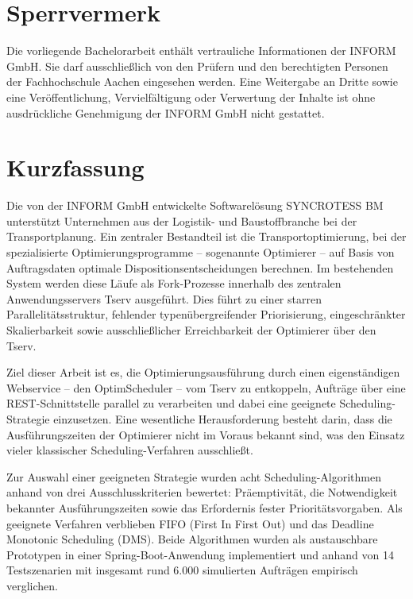 \documentclass[
    12pt,               
    a4paper,            
    ngerman,            
    parskip=half,       
    headings=normal,   
    numbers=enddot,     
    toc=chapterentrywithdots 
]{scrreprt}\usepackage[utf8]{inputenc}
\author{Niklas Paar}
\date{May 2026}
\begin{document}
 

\section*{Sperrvermerk}
Die vorliegende Bachelorarbeit enthält vertrauliche Informationen der INFORM GmbH. 
Sie darf ausschließlich von den Prüfern und den berechtigten Personen der Fachhochschule Aachen 
eingesehen werden. Eine Weitergabe an Dritte sowie eine Veröffentlichung, Vervielfältigung oder 
Verwertung der Inhalte ist ohne ausdrückliche Genehmigung der INFORM GmbH nicht gestattet.
\newpage

\section*{Kurzfassung}
Die von der INFORM GmbH entwickelte Softwarelösung SYNCROTESS BM unterstützt Unternehmen aus der Logistik- und Baustoffbranche bei der Transportplanung. Ein zentraler Bestandteil ist die Transportoptimierung, bei der spezialisierte Optimierungsprogramme -- sogenannte Optimierer -- auf Basis von Auftragsdaten optimale Dispositionsentscheidungen berechnen. Im bestehenden System werden diese Läufe als Fork-Prozesse innerhalb des zentralen Anwendungsservers Tserv ausgeführt. Dies führt zu einer starren Parallelitätsstruktur, fehlender typenübergreifender Priorisierung, eingeschränkter Skalierbarkeit sowie ausschließlicher Erreichbarkeit der Optimierer über den Tserv.

Ziel dieser Arbeit ist es, die Optimierungsausführung durch einen eigenständigen Webservice -- den OptimScheduler -- vom Tserv zu entkoppeln, Aufträge über eine REST-Schnittstelle parallel zu verarbeiten und dabei eine geeignete Scheduling-Strategie einzusetzen. Eine wesentliche Herausforderung besteht darin, dass die Ausführungszeiten der Optimierer nicht im Voraus bekannt sind, was den Einsatz vieler klassischer Scheduling-Verfahren ausschließt.

Zur Auswahl einer geeigneten Strategie wurden acht Scheduling-Algorithmen anhand von drei Ausschlusskriterien bewertet: Präemptivität, die Notwendigkeit bekannter Ausführungszeiten sowie das Erfordernis fester Prioritätsvorgaben. Als geeignete Verfahren verblieben FIFO (First In First Out) und das Deadline Monotonic Scheduling (DMS). Beide Algorithmen wurden als austauschbare Prototypen in einer Spring-Boot-Anwendung implementiert und anhand von 14 Testszenarien mit insgesamt rund 6.000 simulierten Aufträgen empirisch verglichen.
\end{document}

